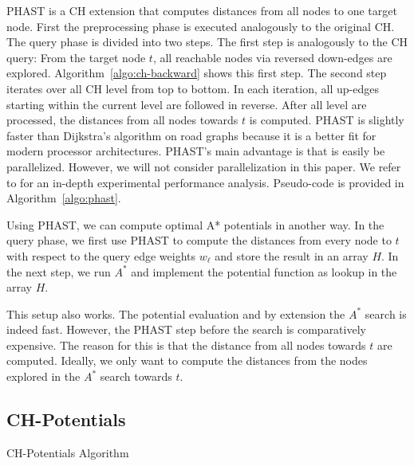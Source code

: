\documentclass[letterpaper]{article} %
\begin{document}
PHAST \cite{dgnw-phast-13} is a CH extension that computes distances from all nodes to one target node.
First the preprocessing phase is executed analogously to the original CH.
The query phase is divided into two steps.
The first step is analogously to the CH query:
From the target node $t$, all reachable nodes via reversed down-edges are explored.
Algorithm~\ref{algo:ch-backward} shows this first step.
The second step iterates over all CH level from top to bottom.
In each iteration, all up-edges starting within the current level are followed in reverse.
After all level are processed, the distances from all nodes towards $t$ is computed.
PHAST is slightly faster than Dijkstra's algorithm on road graphs because it is a better fit for modern processor architectures.
PHAST's main advantage is that is easily be parallelized.
However, we will not consider parallelization in this paper.
We refer to \cite{dgnw-phast-13} for an in-depth experimental performance analysis.
Pseudo-code is provided in Algorithm~\ref{algo:phast}.

Using PHAST, we can compute optimal A* potentials in another way.
In the query phase, we first use PHAST to compute the distances from every node to $t$ with respect to the query edge weights $w_\ell$ and store the result in an array $H$.
In the next step, we run $A^*$ and implement the potential function as lookup in the array $H$.

This setup also works.
The potential evaluation and by extension the $A^*$ search is indeed fast.
However, the PHAST step before the search is comparatively expensive.
The reason for this is that the distance from all nodes towards $t$ are computed.
Ideally, we only want to compute the distances from the nodes explored in the $A^*$ search towards $t$.

\subsection{CH-Potentials}

\begin{algorithm2e}
\caption{CH-Potentials Algorithm}
\label{algo:pot}
\end{algorithm2e}
\end{document}
